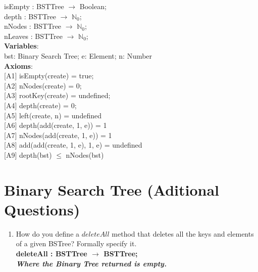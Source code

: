 \documentclass[12pt]{article}
\begin{document}
\begin{spacing}{1.5}
\hspace*{5mm} isEmpty : BSTTree $\rightarrow$ Boolean;\\
\hspace*{5mm} depth : BSTTree $\rightarrow$ $\mathbb{N}_0$;\\
\hspace*{5mm} nNodes : BSTTree $\rightarrow$ $\mathbb{N}_0$;\\
\hspace*{5mm} nLeaves : BSTTree $\rightarrow$ $\mathbb{N}_0$;\\
\noindent \textbf{Variables}:\\
\hspace*{5mm} bst: Binary Search Tree; e: Element; n: Number\\
\noindent \textbf{Axioms}:\\
\hspace*{5mm} [A1] isEmpty(create) = true;\\
\hspace*{5mm} [A2] nNodes(create) = 0;\\
\hspace*{5mm} [A3] rootKey(create) = undefined;\\
\hspace*{5mm} [A4] depth(create) = 0;\\
\hspace*{5mm} [A5] left(create, n) = undefined\\
\hspace*{5mm} [A6] depth(add(create, 1, e)) = 1\\
\hspace*{5mm} [A7] nNodes(add(create, 1, e)) = 1\\
\hspace*{5mm} [A8] add(add(create, 1, e), 1, e) = undefined\\
\hspace*{5mm} [A9] depth(bst) $\leq$ nNodes(bst)\\

\section*{Binary Search Tree (Aditional Questions)}

\begin{enumerate}

\item How do you define a $deleteAll$ method that deletes all the keys and elements of a given BSTree? Formally specify it.\\
\textbf{deleteAll : BSTTree $\rightarrow$ BSTTree; \\ \textit{Where the Binary Tree returned is empty.}}


\end{enumerate}
\end{spacing}
\end{document}
